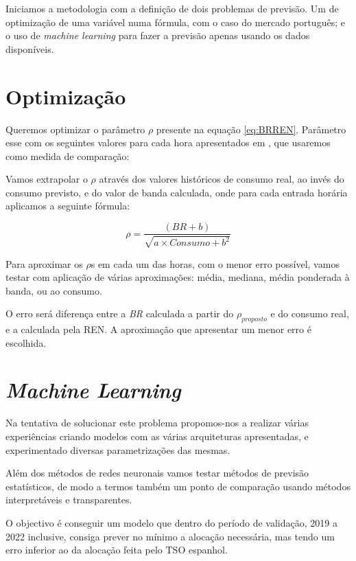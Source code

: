 
Iniciamos a metodologia com a definição de dois problemas de previsão. Um de optimização de uma variável numa fórmula, com o caso do mercado português; e o uso de \textit{machine learning} para fazer a previsão apenas usando os dados disponíveis.\par

\section{Optimização}

Queremos optimizar o parâmetro $\rho$ presente na equação \ref{eq:BRREN}. Parâmetro esse com os seguintes valores para cada hora apresentados em \cite{Carneiro2016}, que usaremos como medida de comparação:\par
\begin{table}[H] \centering \caption{Valores de $\rho$ apresentado em \cite{Carneiro2016}}  \end{table}

Vamos extrapolar o $\rho$ através dos valores históricos de consumo real, ao invés do consumo previsto, e do valor de banda calculada, onde para cada entrada horária aplicamos a seguinte fórmula:\par
\begin{equation} \label{eq:rhoproposed} 
    \rho  = \frac{(BR + b)}{\sqrt{a \times Consumo + b^{2}}}
\end{equation}

Para aproximar os $\rho$s em cada um das horas, com o menor erro possível, vamos testar com aplicação de várias aproximações: média, mediana, média ponderada à banda, ou ao consumo.\par
O erro será diferença entre a \textit{BR} calculada a partir do $\rho_{proposto}$ e do consumo real, e a  calculada pela \gls{REN}. A aproximação que apresentar um menor erro é escolhida.\par


\section{\textit{Machine Learning}}

Na tentativa de solucionar este problema propomos-nos a realizar várias experiências criando modelos com as várias arquiteturas apresentadas, e experimentado diversas parametrizações das mesmas.\par
Além dos métodos de redes neuronais vamos testar métodos de previsão estatísticos, de modo a termos também um ponto de comparação usando métodos interpretáveis e transparentes.\par
O objectivo é conseguir um modelo que dentro do período de validação, 2019 a 2022 inclusive, consiga prever no mínimo a alocação necessária, mas tendo um erro inferior ao da alocação feita pelo \gls{TSO} espanhol.\par




\thispagestyle{plain}
 \label{se:metneuralnet}

% 

